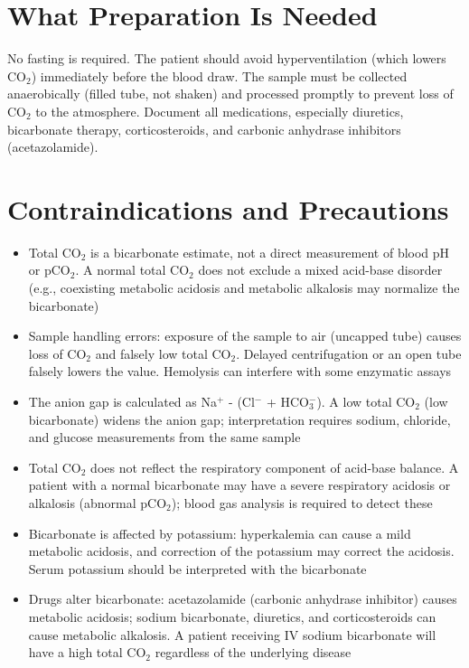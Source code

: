 \section*{What Preparation Is Needed}
No fasting is required. The patient should avoid hyperventilation (which lowers CO$_2$) immediately before the blood draw. The sample must be collected anaerobically (filled tube, not shaken) and processed promptly to prevent loss of CO$_2$ to the atmosphere. Document all medications, especially diuretics, bicarbonate therapy, corticosteroids, and carbonic anhydrase inhibitors (acetazolamide).

\section*{Contraindications and Precautions}
\begin{itemize}
  \item Total CO$_2$ is a bicarbonate estimate, not a direct measurement of blood pH or pCO$_2$. A normal total CO$_2$ does not exclude a mixed acid-base disorder (e.g., coexisting metabolic acidosis and metabolic alkalosis may normalize the bicarbonate)
  \item Sample handling errors: exposure of the sample to air (uncapped tube) causes loss of CO$_2$ and falsely low total CO$_2$. Delayed centrifugation or an open tube falsely lowers the value. Hemolysis can interfere with some enzymatic assays
  \item The anion gap is calculated as Na$^+$ - (Cl$^-$ + HCO$_3^-$). A low total CO$_2$ (low bicarbonate) widens the anion gap; interpretation requires sodium, chloride, and glucose measurements from the same sample
  \item Total CO$_2$ does not reflect the respiratory component of acid-base balance. A patient with a normal bicarbonate may have a severe respiratory acidosis or alkalosis (abnormal pCO$_2$); blood gas analysis is required to detect these
  \item Bicarbonate is affected by potassium: hyperkalemia can cause a mild metabolic acidosis, and correction of the potassium may correct the acidosis. Serum potassium should be interpreted with the bicarbonate
  \item Drugs alter bicarbonate: acetazolamide (carbonic anhydrase inhibitor) causes metabolic acidosis; sodium bicarbonate, diuretics, and corticosteroids can cause metabolic alkalosis. A patient receiving IV sodium bicarbonate will have a high total CO$_2$ regardless of the underlying disease
\end{itemize}
